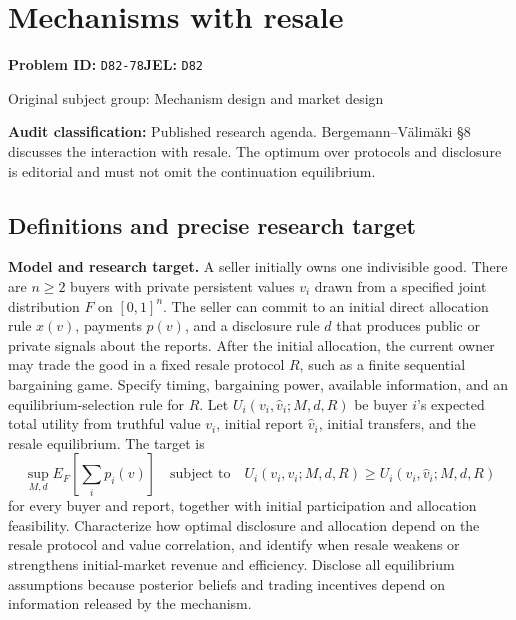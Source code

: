 \documentclass[11pt,a4paper]{article}
\begin{document}
\section*{Mechanisms with resale}
\textbf{Problem ID:} \texttt{D82-78}\quad \textbf{JEL:} \texttt{D82}\par
\label{problem:OP-0292}
{\sffamily\small\color{muted}Original subject group: Mechanism design and market design\par}
\label{definitions:problem:30007574}
\textbf{Audit classification:} Published research agenda. Bergemann–Välimäki §8 discusses the interaction with resale. The optimum over protocols and disclosure is editorial and must not omit the continuation equilibrium.
\subsection*{Definitions and precise research target}
\textbf{Model and research target.} A seller initially owns one indivisible good. There are \(n\geq2\) buyers with private persistent values \(v_i\) drawn from a specified joint distribution \(F\) on \([0,1]^n\). The seller can commit to an initial direct allocation rule \(x(v)\), payments \(p(v)\), and a disclosure rule \(d\) that produces public or private signals about the reports. After the initial allocation, the current owner may trade the good in a fixed resale protocol \(R\), such as a finite sequential bargaining game. Specify timing, bargaining power, available information, and an equilibrium-selection rule for \(R\). Let \(U_i(v_i,\widehat v_i;M,d,R)\) be buyer \(i\)'s expected total utility from truthful value \(v_i\), initial report \(\widehat v_i\), initial transfers, and the resale equilibrium. The target is
\[
 \sup_{M,d}E_F\left[\sum_i p_i(v)\right]
 \quad\text{subject to}\quad
 U_i(v_i,v_i;M,d,R)\geq U_i(v_i,\widehat v_i;M,d,R)
\]
for every buyer and report, together with initial participation and allocation feasibility. Characterize how optimal disclosure and allocation depend on the resale protocol and value correlation, and identify when resale weakens or strengthens initial-market revenue and efficiency. Disclose all equilibrium assumptions because posterior beliefs and trading incentives depend on information released by the mechanism.
\end{document}
